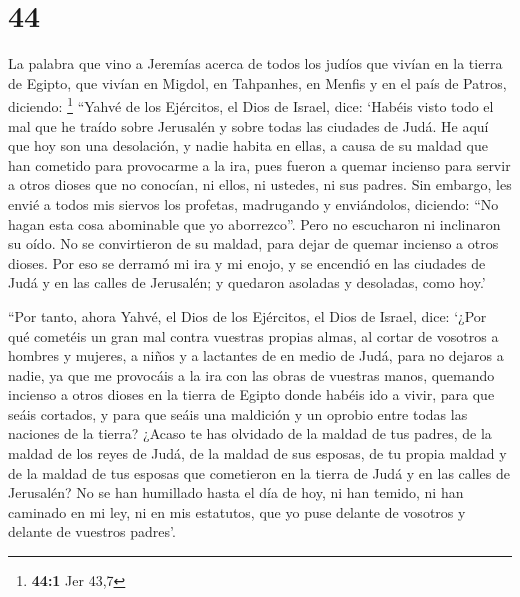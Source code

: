 \hypertarget{section-43}{%
\section{44}\label{section-43}}

 La palabra que vino a Jeremías acerca de todos los judíos
que vivían en la tierra de Egipto, que vivían en Migdol, en Tahpanhes,
en Menfis y en el país de Patros, diciendo: \footnote{\textbf{44:1} Jer
  43,7}  ``Yahvé de los Ejércitos, el Dios de Israel,
dice: `Habéis visto todo el mal que he traído sobre Jerusalén y sobre
todas las ciudades de Judá. He aquí que hoy son una desolación, y nadie
habita en ellas,  a causa de su maldad que han cometido
para provocarme a la ira, pues fueron a quemar incienso para servir a
otros dioses que no conocían, ni ellos, ni ustedes, ni sus padres.
 Sin embargo, les envié a todos mis siervos los profetas,
madrugando y enviándolos, diciendo: ``No hagan esta cosa abominable que
yo aborrezco''.  Pero no escucharon ni inclinaron su oído.
No se convirtieron de su maldad, para dejar de quemar incienso a otros
dioses.  Por eso se derramó mi ira y mi enojo, y se
encendió en las ciudades de Judá y en las calles de Jerusalén; y
quedaron asoladas y desoladas, como hoy.'

 ``Por tanto, ahora Yahvé, el Dios de los Ejércitos, el
Dios de Israel, dice: `¿Por qué cometéis un gran mal contra vuestras
propias almas, al cortar de vosotros a hombres y mujeres, a niños y a
lactantes de en medio de Judá, para no dejaros a nadie, 
ya que me provocáis a la ira con las obras de vuestras manos, quemando
incienso a otros dioses en la tierra de Egipto donde habéis ido a vivir,
para que seáis cortados, y para que seáis una maldición y un oprobio
entre todas las naciones de la tierra?  ¿Acaso te has
olvidado de la maldad de tus padres, de la maldad de los reyes de Judá,
de la maldad de sus esposas, de tu propia maldad y de la maldad de tus
esposas que cometieron en la tierra de Judá y en las calles de
Jerusalén?  No se han humillado hasta el día de hoy, ni
han temido, ni han caminado en mi ley, ni en mis estatutos, que yo puse
delante de vosotros y delante de vuestros padres'.

